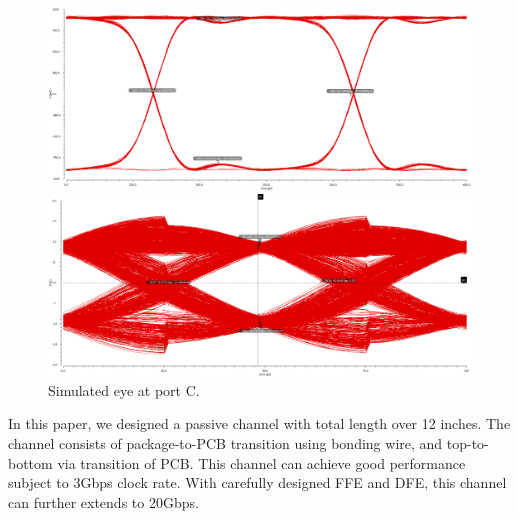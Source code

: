 \documentclass{book}  %
\renewcommand{\section}[1]{\psection{#1}}
\begin{document}
\begin{paper}
\begin{figure}[htbp!]
	\begin{minipage}[tb]{0.5\textwidth}
		\centering	
		\includegraphics[width=\textwidth]{./img/channel_response_eye_diagram/3gbp_eye_total.png}
	\end{minipage}%
	\begin{minipage}[tb]{0.5\textwidth}
		\centering	
		\includegraphics[width=\textwidth]{./img/channel_response_eye_diagram/20gbp_eye_total.png}
	\end{minipage}%
	\label{fig:eye_total_port_C}
	\caption{Simulated eye at port C.}
\end{figure}

\section{Conclusion}
In this paper, we designed a passive channel with total length over 12 inches. The channel consists of package-to-PCB transition using bonding wire, and top-to-bottom via transition of PCB. This channel can achieve good performance subject to 3Gbps clock rate. With carefully designed FFE and DFE, this channel can further extends to 20Gbps. 





%

\end{paper}
\end{document}
